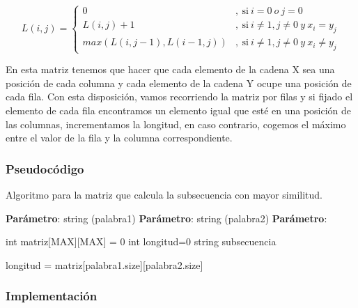 \[
  L(i,j) = 
  \left \{
    \begin{aligned}
      0 &,\ \text{si} \ i = 0 \ o \ j = 0\\
      L(i,j) + 1 &,\ \text{si} \ i \neq  1 , j \neq  0 \ y \ x_i = y_j\\
      max(L(i,j-1) , L(i-1,j))&,\ \text{si} \ i \neq 1 , j \neq 0 \ y \ x_i \neq y_j
    \end{aligned}
  \right .
\]

En esta matriz tenemos que hacer que cada elemento de la cadena X sea una posición de cada columna 
y cada elemento de la cadena Y ocupe una posición de cada fila. Con esta disposición, vamos recorriendo
la matriz por filas y si fijado el elemento de cada fila encontramos un elemento igual que esté en una 
posición de las columnas, incrementamos la longitud, en caso contrario, cogemos el máximo entre el valor de 
la fila y la columna correspondiente.

\subsubsection{Pseudocódigo}

\begin{algorithm}[H]
  \caption{Algoritmo para la matriz que calcula la subsecuencia con mayor similitud.}\label{alg:simil}
  \begin{minipage}{0.92\textwidth}
  \textbf{Parámetro}: string (palabra1)
  \textbf{Parámetro}: string (palabra2)
  \textbf{Parámetro}: 
  \end{minipage}

  int matriz[MAX][MAX] = {0}\;
  int longitud=0\;
  string subsecuencia\;

   {
     {
    }
  }

  longitud = matriz[palabra1.size][palabra2.size]\;  
\end{algorithm}

\subsubsection{Implementación}


